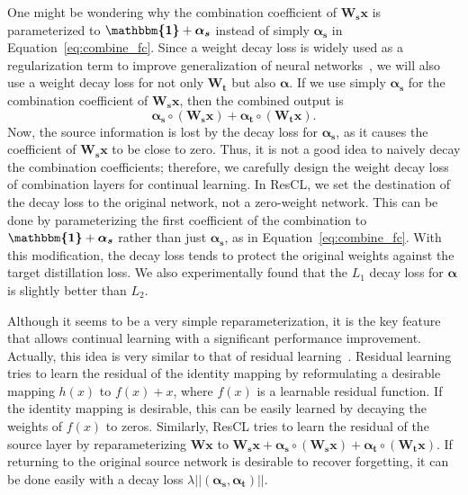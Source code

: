 \documentclass[letterpaper]{article}
\begin{document}
One might be wondering why the combination coefficient of $\bm{W_s x}$ is parameterized to $\bm{\mathbbm{1}} + \bm{\alpha_s}$ instead of simply $\bm{\alpha_s}$ in Equation~\ref{eq:combine_fc}.
Since a weight decay loss is widely used as a regularization term to improve generalization of neural networks~\cite{krogh1992simple}, we will also use a weight decay loss for not only $\bm{W_t}$ but also $\bm{\alpha}$. If we use simply $\bm{\alpha_s}$ for the combination coefficient of $\bm{W_s x}$, then the combined output is
\begin{equation}
\bm{\alpha_s} \circ \left(\bm{W_s x}\right) + \bm{\alpha_t} \circ \left(\bm{W_t x}\right) .
\label{eq:combine_decay}
\end{equation}
Now, the source information is lost by the decay loss for $\bm{\alpha_s}$, as it causes the coefficient of $\bm{W_s x}$ to be close to zero. Thus, it is not a good idea to naively decay the combination coefficients; therefore, we carefully design the weight decay loss of combination layers for continual learning. In ResCL, we set the destination of the decay loss to the original network, not a zero-weight network. This can be done by parameterizing the first coefficient of the combination to $\bm{\mathbbm{1}}+\bm{\alpha_s}$ rather than just $\bm{\alpha_s}$, as in Equation~\ref{eq:combine_fc}. With this modification, the decay loss tends to protect the original weights against the target distillation loss. We also experimentally found that the $L_1$ decay loss for $\bm{\alpha}$ is slightly better than $L_2$.

Although it seems to be a very simple reparameterization, it is the key feature that allows continual learning with a significant performance improvement. Actually, this idea is very similar to that of residual learning~\cite{he2016deep}. Residual learning tries to learn the residual of the identity mapping by reformulating a desirable mapping $h(x)$ to $f(x) + x$, where $f(x)$ is a learnable residual function. If the identity mapping is desirable, this can be easily learned by decaying the weights of $f(x)$ to zeros. Similarly, ResCL tries to learn the residual of the source layer by reparameterizing $\bm{W x}$ to $\bm{W_s x} + \bm{\alpha_s} \circ \left( \bm{W_s x} \right) + \bm{\alpha_t} \circ \left( \bm{W_t x} \right)$. If returning to the original source network is desirable to recover forgetting, it can be done easily with a decay loss $\lambda || ( \bm{\alpha_s}, \bm{\alpha_t} ) ||$. 
\end{document}
